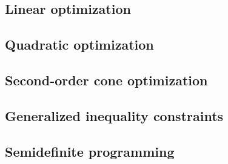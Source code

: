 \subsection{Linear optimization}

\subsection{Quadratic optimization}

\subsection{Second-order cone optimization}

\subsection{Generalized inequality constraints}

\subsection{Semidefinite programming}